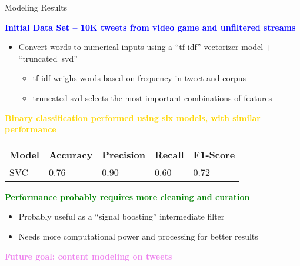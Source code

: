 \documentclass[aspectratio=169]{beamer}
\begin{document}
\begin{frame}{Modeling Results}
  \begin{center}
    \textcolor{blue}{\bf Initial Data Set -- 10K tweets from video game
      and unfiltered streams}
  \end{center}

  \begin{itemize}
  \item Convert words to numerical inputs using a ``tf-idf''
    vectorizer model + ``truncated~svd''

    \begin{itemize}
    \item tf-idf weighs words based on frequency in tweet and corpus
    \item truncated svd selects the most important combinations of
      features
    \end{itemize}
  \end{itemize}

  \begin{center}
    \textcolor{gold}{\bf Binary classification performed using six models,
      with similar performance}
  \end{center}

  \begin{center}
    \begin{tabular}{|l|l|l|l|l|}
      \hline
      Model & Accuracy & Precision & Recall & F1-Score \\
      \hline
      SVC & 0.76 & 0.90 & 0.60 & 0.72 \\
      \hline
    \end{tabular}
  \end{center}

  \begin{center}
    \textcolor{green}{\bf Performance probably requires more cleaning and
      curation}
  \end{center}

  \begin{itemize}
  \item Probably useful as a ``signal boosting'' intermediate filter
  \item Needs more computational power and processing for better results
  \end{itemize}

  \begin{center}
    \textcolor{violet}{\large \bf Future goal: content modeling on tweets}
  \end{center}

\end{frame}

\end{document}
